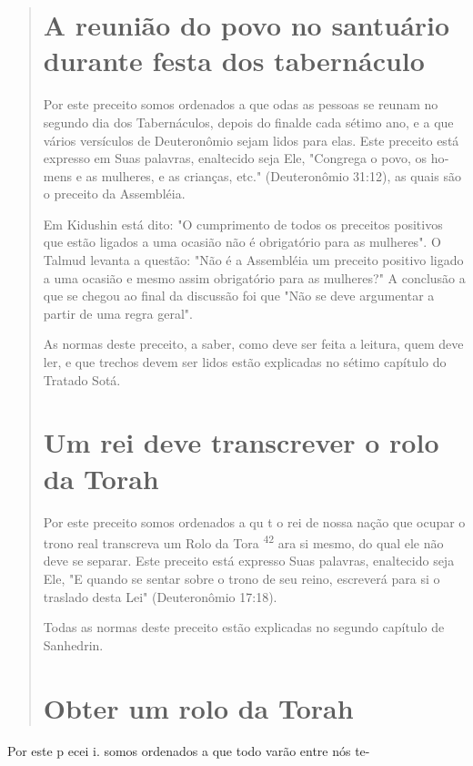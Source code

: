 \begin{quote}

\section{A reunião do povo no santuário durante festa dos tabernáculo}

Por este preceito somos ordenados a que odas as pessoas se reu­nam no
segundo dia dos Tabernáculos, depois do finalde cada sétimo ano, e a que
vários versículos de Deuteronômio sejam lidos para elas. Este preceito
está expresso em Suas palavras, enaltecido seja Ele, "Congrega o povo,
os ho­mens e as mulheres, e as crianças, etc." (Deuteronômio 31:12), as
quais são o preceito da Assembléia.

Em Kidushin está dito: "O cumprimento de todos os preceitos posi­tivos
que estão ligados a uma ocasião não é obrigatório para as mulheres". O
Talmud levanta a questão: "Não é a Assembléia um preceito positivo
ligado a uma ocasião e mesmo assim obrigatório para as mulheres?" A
conclusão a que se chegou ao final da discussão foi que "Não se deve
argumentar a partir de uma regra geral".

As normas deste preceito, a saber, como deve ser feita a leitura, quem
deve ler, e que trechos devem ser lidos estão explicadas no sétimo
capítulo do Tratado Sotá.

\section{Um rei deve transcrever o rolo da Torah}

Por este preceito somos ordenados a qu t o rei de nossa nação que ocupar
o trono real transcreva um Rolo da Tora \textsuperscript{42} ara si
mesmo, do qual ele não deve se separar. Este preceito está expresso Suas
palavras, enalteci­do seja Ele, "E quando se sentar sobre o trono de seu
reino, escreverá para si o traslado desta Lei" (Deuteronômio 17:18).

Todas as normas deste preceito estão explicadas no segundo capítu­lo de
Sanhedrin.

\section{Obter um rolo da Torah}

\end{quote}

Por este p ecei i. somos ordenados a que todo varão entre nós te-

